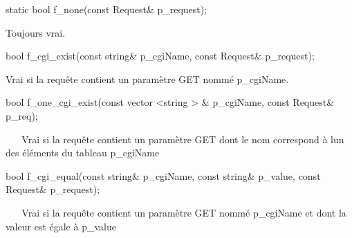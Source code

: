 \begin{DoxyItemize}
\item 
\begin{DoxyCode}
\textcolor{keyword}{static} \textcolor{keywordtype}{bool} f\_none(\textcolor{keyword}{const} Request& p\_request); 
\end{DoxyCode}
 Toujours vrai. ~\newline
~\newline
 ~\newline
~\newline

\item 
\begin{DoxyCode}
\textcolor{keywordtype}{bool} f\_cgi\_exist(\textcolor{keyword}{const} \textcolor{keywordtype}{string}& p\_cgiName, \textcolor{keyword}{const} Request& p\_request); 
\end{DoxyCode}
 Vrai si la requête contient un paramètre G\+ET nommé p\+\_\+cgi\+Name. ~\newline
~\newline
 ~\newline
~\newline

\item 
\begin{DoxyCode}
\textcolor{keywordtype}{bool} f\_one\_cgi\_exist(\textcolor{keyword}{const} vector <string > & p\_cgiName, \textcolor{keyword}{const} Request& p\_req); 
\end{DoxyCode}
 ~\newline
~\newline
 Vrai si la requête contient un paramètre G\+ET dont le nom correspond à l\textquotesingle{}un des éléments du tableau p\+\_\+cgi\+Name ~\newline
~\newline

\item 
\begin{DoxyCode}
\textcolor{keywordtype}{bool} f\_cgi\_equal(\textcolor{keyword}{const} \textcolor{keywordtype}{string}& p\_cgiName, \textcolor{keyword}{const} \textcolor{keywordtype}{string}& p\_value, \textcolor{keyword}{const} Request& p\_request); 
\end{DoxyCode}
 ~\newline
~\newline
 Vrai si la requête contient un paramètre G\+ET nommé p\+\_\+cgi\+Name et dont la valeur est égale à p\+\_\+value ~\newline
~\newline


\end{DoxyItemize}
